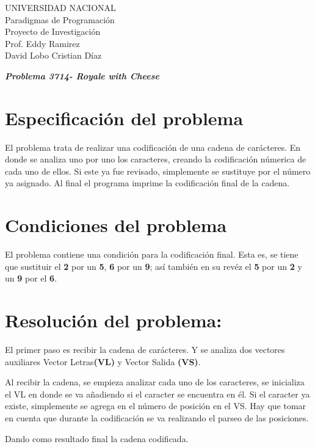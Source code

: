 \documentclass[12pt,a4paper]{article}
\begin{document}
\begin{center}
\begin{LARGE}
UNIVERSIDAD NACIONAL \\
Paradigmas de Programaci\'on \\
Proyecto de Investigaci\'on \\
Prof. Eddy Ramirez \\
David Lobo
Cristian Díaz
\end{LARGE}
\end{center}

\begin{center}
{\Huge{\textbf{\em Problema 3714- Royale with Cheese}}}
\end{center}

\section{Especificación del problema}
El problema trata de realizar una codificaci\'on de una cadena de car\'acteres. En donde se analiza uno por uno los caracteres, creando la codificaci\'on n\'umerica de cada uno de ellos. Si este ya fue revisado, simplemente se sustituye por el n\'umero ya asignado. Al final el programa imprime la codificaci\'on final de la cadena.

\section{Condiciones del problema}
El problema contiene una condici\'on para la codificaci\'on final. Esta es, se tiene que sustituir el {\bf 2} por un {\bf 5}, {\bf 6} por un {\bf 9}; as\'i tambi\'en en su rev\'ez el {\bf 5} por un {\bf 2} y un {\bf 9} por el {\bf 6}.

\section{Resoluci\'on del problema: }
El primer paso es recibir la cadena de car\'acteres. Y se analiza dos vectores auxiliares Vector Letras{\bf (VL)} y Vector Salida {\bf (VS)}.

Al recibir la cadena, se empieza analizar cada uno de los caracteres, se inicializa el VL en donde se va añadiendo si el caracter se encuentra en \'el.  Si el caracter ya existe, simplemente se agrega en el n\'umero de posici\'on en el VS. Hay que tomar en cuenta que durante la codificaci\'on se va realizando el parseo de las posiciones.

Dando como resultado final la cadena codificada.
\end{document}
